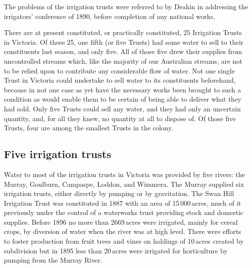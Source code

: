 The problems of the irrigation trusts were referred to by Deakin
 in
addressing the irrigators' conference of 1890, before completion of
any national works,
\begin{Quote}
	There are at present constituted, or practically constituted,
	25 Irrigation Trusts in Victoria.  Of these 25, one fifth (or
	five Trusts) had some water to sell to their constituents last
	season, and only five.  All of those five drew their supplies
	from uncontrolled streams which, like the majority of our
	Australian streams, are not to be relied upon to contribute
	any considerable flow of water. Not one single Trust in
	Victoria could undertake to sell water to its constituents
	beforehand, because in not one case as yet have the necessary
	works been brought to such a condition as would enable them to
	be certain of being able to deliver what they had sold. Only
	five Trusts could sell any water, and they had only an
	uncertain quantity, and, for all they knew, no quantity at all
	to dispose of.  Of those five Trusts, four are among the
	smallest Trusts in the colony.
\end{Quote}

\subsection*{Five irrigation trusts}

Water to most of the irrigation trusts in Victoria was provided by
five rivers: the Murray, Goulburn, Campaspe, Loddon, and Wimmera.  The
Murray supplied six irrigation trusts, either directly by pumping or
by gravitation.  The Swan Hill Irrigation Trust
 was constituted in
1887 with an area of 15\,000\,acres, much of it previously under the
control of a waterworks trust providing stock and domestic supplies.
Before 1896 no more than 2669\,acres were irrigated, main\-ly for
cereal crops, by diversion of water when the river was at high
level. There were efforts to foster production from fruit trees and
vines on holdings of 10\,acres created by subdivision but in 1895 less
than 20\,acres were irrigated for horticulture by pumping from the
Murray River.


